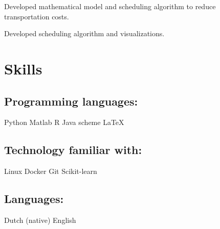 \documentclass[]{deedy-resume-openfont}
\begin{document}
Developed mathematical model and scheduling algorithm to reduce transportation costs.


\sectionsep

Developed scheduling algorithm and visualizations.
\sectionsep



\section{Skills}
\subsection{Programming languages:}
  Python \textbullet{}  Matlab \textbullet{}
 R \textbullet{} Java \textbullet{} scheme \textbullet{} \LaTeX\ \\ 
 \vspace{\topsep} %
\subsection{Technology familiar with:}
Linux \textbullet{} Docker \textbullet{} Git \textbullet{} Scikit-learn
 \vspace{\topsep} %
\subsection{Languages:}
Dutch (native) \textbullet{} English
\sectionsep
\end{document}
